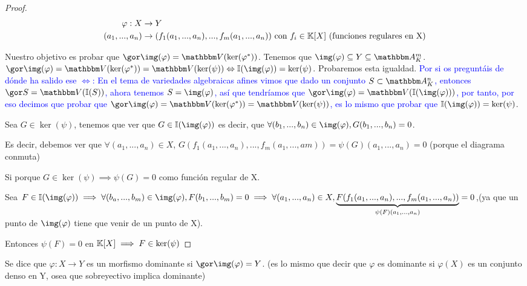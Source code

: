 \begin{proof}
	\begin{align*}
		\varphi: X & \rightarrow Y \\
		(a_1,...,a_n) & \rightarrow (f_1(a_1,...,a_n),...,f_m(a_1,...,a_n)) \text{ con } 	f_i \in \mathbb{K}[X] \text{ (funciones regulares en X)}
	\end{align*}

	Nuestro objetivo es probar que $\cls{\img(\varphi)}=\V(\ker(\varphi^*))$. Tenemos que $\img(\varphi) \subseteq Y \subseteq \A_K^m$. $\cls{\img(\varphi)}=\V(\ker(\varphi^*))=\V(\ker(\psi)) \Leftrightarrow \I(\img(\varphi))=\ker(\psi)$. Probaremos esta igualdad.
	\textcolor{blue}{Por si os preguntáis de dónde ha salido ese $\Leftrightarrow$: En el tema de variedades algebraicas afines vimos que dado un conjunto $S \subset \Akn$, entonces $\cls{S}=\V(\I(S))$, ahora tenemos $S=\img(\varphi)$, así que tendríamos que $\cls{\img(\varphi)}=\V(\I(\img(\varphi)))$, por tanto, por eso decimos que probar que $\cls{\img(\varphi)}=\V(\ker(\varphi^*))=\V(\ker(\psi))$, es lo mismo que probar que $\I(\img(\varphi))=\ker(\psi)$}.

	\proofpart{	$\ker(\psi) \subset \I(\img(\varphi))$:}


	Sea $G \in \ker(\psi)$, tenemos que ver que $G \in \I(\img(\varphi))$ es decir, que $\forall (b_1,...,b_n) \in \img(\varphi), G(b_1,...,b_n)=0$.

	Es decir, debemos ver que $\forall (a_1,...,a_n) \in X$,  $G(f_1(a_1,...,a_n),...,f_m(a_1,...,am))=\psi(G)(a_1,...,a_n)=0$ (porque el diagrama conmuta)

	Si porque $G \in \ker(\psi) \implies \psi(G)=0$ como función regular de X.

	\proofpart{$\ker(\psi) \supset \I(\img(\varphi))$:}


	Sea $F \in \I(\img(\varphi)) \implies \forall (b_a,...,b_m) \in  \img(\varphi), F(b_1,...,b_m)=0 \implies \forall(a_1,...,a_n) \in X, \underbrace{F(f_1(a_1,...,a_n),...,f_m(a_1,...,a_n))}_{\psi(F)(a_1,...,a_n)}=0$,(ya que un punto de $\img(\varphi)$ tiene que venir de un punto de X).

	Entonces $\psi(F)=0$ en $\mathbb{K}[X] \implies F \in \ker(\psi)$
\end{proof}


\begin{defn}
	Se dice que $\varphi: X \rightarrow Y$ es un morfismo dominante si $\cls{\img(\varphi)}=Y$. (es lo mismo que decir que $\varphi$ es dominante si $\varphi(X)$ es un conjunto denso en Y, osea que sobreyectivo implica dominante)
\end{defn}

